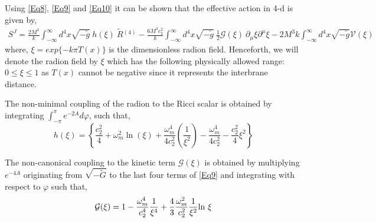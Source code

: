 \documentclass{article}
\begin{document}
Using \ref{Eq8}, \ref{Eq9} and \ref{Eq10} it can be shown that the effective action in 4-d is given by,
\begin{align}
S^J = \frac{2M^3}{k} \int_{-\infty} ^{\infty} d^4x \sqrt{-\tilde{g}}~h(\xi)~\tilde{R}{^{(4)}}  -\frac{6M^3c_2^2}{k}\int_{-\infty}^{\infty} d^{4}x \sqrt{-\tilde{g}}~ \frac{1}{2} \mathcal{G}(\xi) ~\partial_\mu \xi\partial^\mu\xi -2M^3 k \int_{-\infty} ^{\infty} d^4x \sqrt{-\tilde{g}} \mathcal{V}(\xi)
\label{Eq11}
\end{align}
where, $\xi= exp \lbrace-k\pi T(x) \rbrace$ is the dimensionless radion field. Henceforth, we will denote the radion field by $\xi$ which has the following physically allowed range: $0\leq \xi \leq 1$ as $T(x)$ cannot be negative since it represents the interbrane distance.

The non-minimal coupling of the radion to the Ricci scalar is obtained by integrating $\int_{-\pi}^\pi e^{-2A} d\varphi$, such that,
\begin{equation}
h(\xi)=\left\{\frac{c_2^2}{4}+\omega_m^2 \ln\left(\xi\right)+\frac{\omega_m^4}{4c_2^2}\left(\frac{1}{\xi^2}\right)-\frac{\omega_m^4}{4c_2^2}-\frac{c_2^2}{4}\xi^2 \right\}
\label{Eq12}
\end{equation}

The non-canonical coupling to the kinetic term $\mathcal{G}(\xi)$ is obtained by multiplying $e^{-4A}$ originating from $\sqrt{-\tilde{G}}$ to the last four terms of \ref{Eq9} and integrating with respect to $\varphi$ such that,
\begin{align}
\mathcal{G}(\xi)=  1-\frac{\omega_m^4}{c_2^4}\frac{1}{\xi^4}+\frac{4}{3}\frac{\omega_m^2}{c_2^2}\frac{1}{\xi^2}{ \rm ln} ~\xi 
\label{Eq13}
\end{align}
\end{document}
